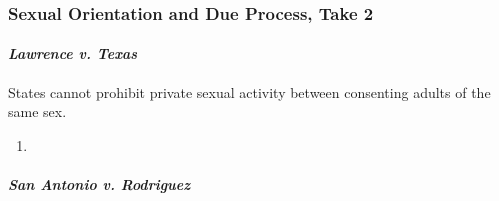 \subsubsection{Sexual Orientation and Due Process, Take 2}

\paragraph{\emph{Lawrence v. Texas}}

States cannot prohibit private sexual activity between consenting adults of 
the same sex.

\begin{enumerate}
    \item %
\end{enumerate}
% 
% 
% 
% 
% 
% 
% 
% 
\paragraph{\emph{San Antonio v. Rodriguez}}

